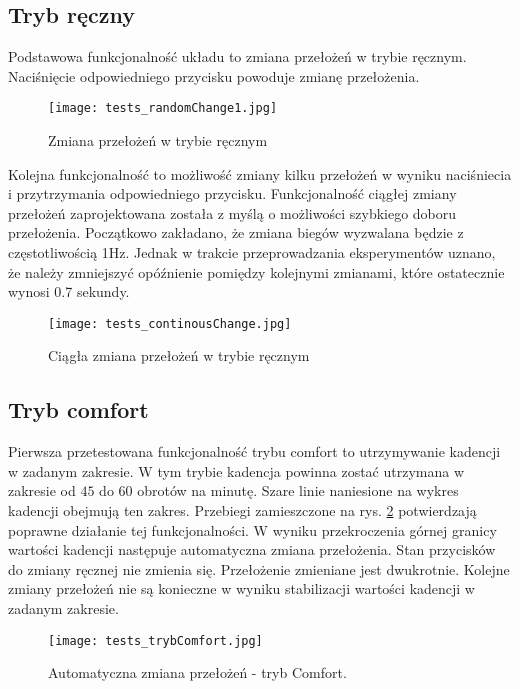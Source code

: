 \subsection{Tryb ręczny}
Podstawowa funkcjonalność układu to zmiana przełożeń w trybie ręcznym. Naciśnięcie odpowiedniego przycisku powoduje zmianę przełożenia.
 
\begin{figure}[h]
    \centering
    \texttt{[image: tests\_randomChange1.jpg]}
    \caption{Zmiana przełożeń w trybie ręcznym}
    \label{fig:tests_randomChange}
\end{figure}

Kolejna funkcjonalność to możliwość zmiany kilku przełożeń w wyniku naciśniecia i przytrzymania odpowiedniego przycisku. Funkcjonalność ciągłej zmiany przełożeń zaprojektowana została z myślą o możliwości szybkiego doboru przełożenia. Początkowo zakładano, że zmiana biegów wyzwalana będzie z częstotliwością 1Hz. Jednak w trakcie przeprowadzania eksperymentów uznano, że należy zmniejszyć opóźnienie pomiędzy kolejnymi zmianami, które ostatecznie wynosi 0.7 sekundy.

\begin{figure}[h]
    \centering
    \texttt{[image: tests\_continousChange.jpg]}
    \caption{Ciągła zmiana przełożeń w trybie ręcznym}
    \label{fig:tests_continousChange}
\end{figure}
\subsection{Tryb comfort}

Pierwsza przetestowana funkcjonalność trybu comfort to utrzymywanie kadencji w zadanym zakresie. W tym trybie  kadencja powinna zostać utrzymana w zakresie od $45$ do $60$ obrotów na minutę. Szare linie naniesione na wykres kadencji obejmują ten zakres. Przebiegi zamieszczone na rys. \ref{fig:tests_continousChange} potwierdzają poprawne działanie tej funkcjonalności. W wyniku przekroczenia górnej granicy wartości kadencji następuje automatyczna zmiana przełożenia. Stan przycisków do zmiany ręcznej nie zmienia się. Przełożenie zmieniane jest dwukrotnie. Kolejne zmiany przełożeń nie są konieczne w wyniku stabilizacji wartości kadencji w zadanym zakresie. 
\begin{figure}[h]
    \centering
    \texttt{[image: tests\_trybComfort.jpg]}
    \caption{Automatyczna zmiana przełożeń - tryb Comfort.}
    \label{fig:tests_trybComfort}
\end{figure}

